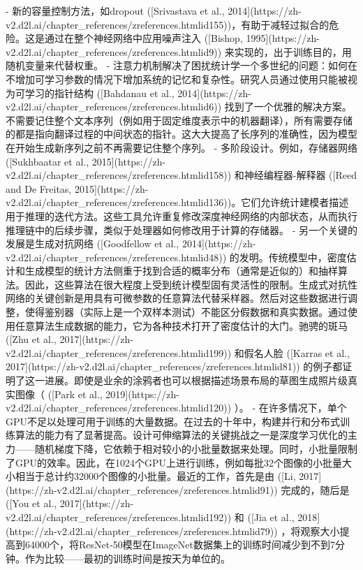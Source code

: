 - 新的容量控制方法，如dropout ([Srivastava et al., 2014](https://zh-v2.d2l.ai/chapter\_references/zreferences.htmlid155))，有助于减轻过拟合的危险。这是通过在整个神经网络中应用噪声注入 ([Bishop, 1995](https://zh-v2.d2l.ai/chapter\_references/zreferences.htmlid9)) 来实现的，出于训练目的，用随机变量来代替权重。
- 注意力机制解决了困扰统计学一个多世纪的问题：如何在不增加可学习参数的情况下增加系统的记忆和复杂性。研究人员通过使用只能被视为可学习的指针结构 ([Bahdanau et al., 2014](https://zh-v2.d2l.ai/chapter\_references/zreferences.htmlid6)) 找到了一个优雅的解决方案。不需要记住整个文本序列（例如用于固定维度表示中的机器翻译），所有需要存储的都是指向翻译过程的中间状态的指针。这大大提高了长序列的准确性，因为模型在开始生成新序列之前不再需要记住整个序列。
- 多阶段设计。例如，存储器网络 ([Sukhbaatar et al., 2015](https://zh-v2.d2l.ai/chapter\_references/zreferences.htmlid158)) 和神经编程器-解释器 ([Reed and De Freitas, 2015](https://zh-v2.d2l.ai/chapter\_references/zreferences.htmlid136))。它们允许统计建模者描述用于推理的迭代方法。这些工具允许重复修改深度神经网络的内部状态，从而执行推理链中的后续步骤，类似于处理器如何修改用于计算的存储器。
- 另一个关键的发展是生成对抗网络 ([Goodfellow et al., 2014](https://zh-v2.d2l.ai/chapter\_references/zreferences.htmlid48)) 的发明。传统模型中，密度估计和生成模型的统计方法侧重于找到合适的概率分布（通常是近似的）和抽样算法。因此，这些算法在很大程度上受到统计模型固有灵活性的限制。生成式对抗性网络的关键创新是用具有可微参数的任意算法代替采样器。然后对这些数据进行调整，使得鉴别器（实际上是一个双样本测试）不能区分假数据和真实数据。通过使用任意算法生成数据的能力，它为各种技术打开了密度估计的大门。驰骋的斑马 ([Zhu et al., 2017](https://zh-v2.d2l.ai/chapter\_references/zreferences.htmlid199)) 和假名人脸 ([Karras et al., 2017](https://zh-v2.d2l.ai/chapter\_references/zreferences.htmlid81)) 的例子都证明了这一进展。即使是业余的涂鸦者也可以根据描述场景布局的草图生成照片级真实图像（ ([Park et al., 2019](https://zh-v2.d2l.ai/chapter\_references/zreferences.htmlid120)) ）。
- 在许多情况下，单个GPU不足以处理可用于训练的大量数据。在过去的十年中，构建并行和分布式训练算法的能力有了显著提高。设计可伸缩算法的关键挑战之一是深度学习优化的主力——随机梯度下降，它依赖于相对较小的小批量数据来处理。同时，小批量限制了GPU的效率。因此，在1024个GPU上进行训练，例如每批32个图像的小批量大小相当于总计约32000个图像的小批量。最近的工作，首先是由 ([Li, 2017](https://zh-v2.d2l.ai/chapter\_references/zreferences.htmlid91)) 完成的，随后是 ([You et al., 2017](https://zh-v2.d2l.ai/chapter\_references/zreferences.htmlid192)) 和 ([Jia et al., 2018](https://zh-v2.d2l.ai/chapter\_references/zreferences.htmlid79)) ，将观察大小提高到64000个，将ResNet-50模型在ImageNet数据集上的训练时间减少到不到7分钟。作为比较——最初的训练时间是按天为单位的。
